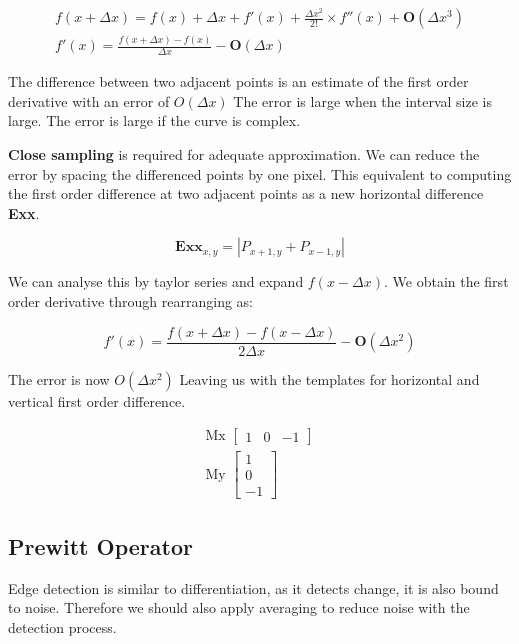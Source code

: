 \begin{align}
   f(x+\Delta x) =  f(x) + \Delta x + f'(x) + \frac{\Delta x^{2}}{2!}\times f''(x) + \mathbf{O}(\Delta x^{3}) \\
   f'(x) = \frac{f(x+\Delta x) - f(x)}{\Delta x} - \mathbf{O}(\Delta x)
\end{align}

The difference between two adjacent points is an estimate of the first order derivative with an error of $O(\Delta x)$
The error is large when the interval size is large. The error is large if the curve is complex.

\textbf{Close sampling} is required for adequate approximation. We can reduce the error by spacing the differenced points by one pixel. This equivalent to computing the first order difference at two adjacent points as a new horizontal difference \textbf{Exx}.

\begin{equation}
    \textbf{Exx}_{x,y} = | P_{x+1,y} + P_{x-1,y} |
\end{equation}

We can analyse this by taylor series and expand $f(x-\Delta x)$. We obtain the first order derivative through rearranging as:

\begin{equation}
    f'(x) = \frac{f(x+\Delta x) - f(x-\Delta x)}{2\Delta x} - \mathbf{O}(\Delta x^{2})
\end{equation}

The error is now $O(\Delta x^{2})$ Leaving us with the templates for horizontal and vertical first order difference.

\begin{align}
    \text{Mx }\begin{bmatrix}
    1 & 0 & -1
    \end{bmatrix} \\ 
    \text{My }\begin{bmatrix}
    1 \\
    0 \\
    -1
    \end{bmatrix}
\end{align}

\subsection{Prewitt Operator}
Edge detection is similar to differentiation, as it detects change, it is also bound to noise. Therefore we should also apply averaging to reduce noise with the detection process.

